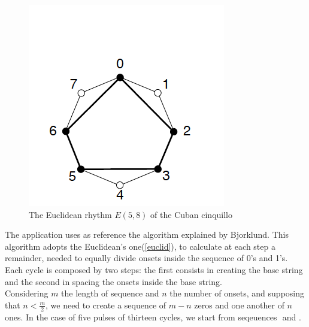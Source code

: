 \documentclass[main.tex]{subfiles}
\begin{document}
\begin{figure}[htbp]
\centering
\includegraphics{images/cuban_cinquillo.png}
\caption{The Euclidean rhythm $E(5,8)$ of the Cuban cinquillo}
\label{fig:1}
\end{figure}
The application uses as reference the algorithm explained by Bjorklund\cite{Bjorklund:2003:euclidean:rhythm}. This algorithm adopts the Euclidean's one(\autoref{euclid}), to calculate at each step a remainder, needed to equally divide onsets inside the sequence of 0's and 1's.\\
Each cycle is composed by two steps: the first consists in creating the base string and the second in spacing the onsets inside the base string.\\
Considering \begin{math}m\end{math} the length of sequence and \begin{math}n\end{math} the number of onsets, and supposing that \begin{math}n<\frac{m}{2}\end{math}, we need to create a sequence of \begin{math}m-n\end{math} zeros and one another of \begin{math}n\end{math} ones. In the case of five pulses of thirteen cycles, we start from seqeuences \begin{math}[00000000]\end{math} and \begin{math}[11111]\end{math}.\\
\end{document}
